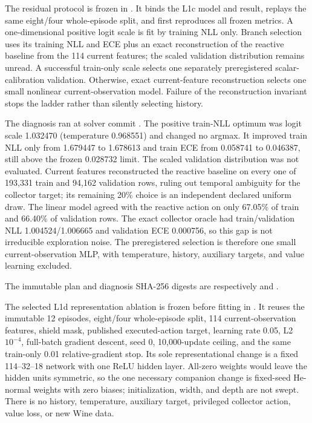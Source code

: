 \documentclass[11pt]{article}
\begin{document}
The residual protocol is frozen in
.  It binds the L1c
model and result, replays the same eight/four whole-episode split, and first
reproduces all frozen metrics.  A one-dimensional positive logit scale is fit
by training NLL only.  Branch selection uses its training NLL and ECE plus an
exact reconstruction of the reactive baseline from the 114 current features;
the scaled validation distribution remains unread.  A successful train-only
scale selects one separately preregistered scalar-calibration validation.
Otherwise, exact current-feature reconstruction selects one small nonlinear
current-observation model.  Failure of the reconstruction invariant stops the
ladder rather than silently selecting history.

The diagnosis ran at solver commit
.  The positive train-NLL
optimum was logit scale 1.032470 (temperature 0.968551) and changed no argmax.
It improved train NLL only from 1.679447 to 1.678613 and train ECE from
0.058741 to 0.046387, still above the frozen 0.028732 limit.  The scaled
validation distribution was not evaluated.  Current features reconstructed
the reactive baseline on every one of 193,331 train and 94,162 validation
rows, ruling out temporal ambiguity for the collector target; its remaining
20\% choice is an independent declared uniform draw.  The linear model agreed
with the reactive action on only 67.05\% of train and 66.40\% of validation
rows.  The exact collector oracle had train/validation NLL 1.004524/1.006665
and validation ECE 0.000756, so this gap is not irreducible exploration noise.
The preregistered selection is therefore one small current-observation MLP,
with temperature, history, auxiliary targets, and value learning excluded.

The immutable plan and diagnosis SHA-256 digests are respectively
and
.

The selected L1d representation ablation is frozen before fitting in
.  It reuses the immutable 12
episodes, eight/four whole-episode split, 114 current-observation features,
shield mask, published executed-action target, learning rate 0.05, L2
$10^{-4}$, full-batch gradient descent, seed 0, 10,000-update ceiling, and the
same train-only 0.01 relative-gradient stop.  Its sole representational change
is a fixed 114--32--18 network with one ReLU hidden layer.  All-zero weights
would leave the hidden units symmetric, so the one necessary companion change
is fixed-seed He-normal weights with zero biases; initialization, width, and
depth are not swept.  There is no history, temperature, auxiliary target,
privileged collector action, value loss, or new Wine data.
\end{document}
